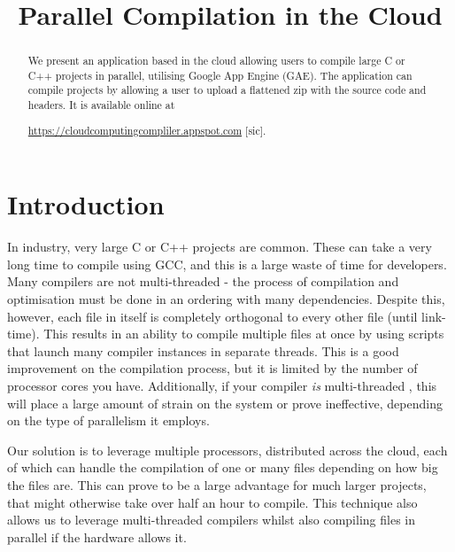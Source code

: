 \documentclass[conference]{IEEEtran}
\begin{document}
\title{Parallel Compilation in the Cloud}

\author{
\and
{}
}

\maketitle

\begin{abstract}
We present an application based in the cloud allowing users to compile large C
or C++ projects in parallel, utilising Google App Engine (GAE). The application
can compile projects by allowing a user to upload a flattened zip with the
source code and headers. It is available online at

\noindent\url{https://cloudcomputingcompliler.appspot.com} [sic].

\end{abstract}
\section{Introduction}
In industry, very large C or C++ projects are common. These can take a very
long time to compile using GCC, and this is a
large waste of time for developers. Many compilers are not multi-threaded - the
process of compilation and optimisation must be done in an ordering
with many dependencies. Despite this, however, each file in itself is completely
orthogonal to every other file (until link-time). This results in an ability to
compile multiple files at once by using scripts that launch many compiler
instances in separate threads. This is a good improvement on the compilation
process, but it is limited by the number of processor cores you have.
Additionally, if your compiler \emph{is} multi-threaded \cite{rust}, this will
place a large amount of strain on the system or prove ineffective, depending on
the type of parallelism it employs.

Our solution is to leverage multiple processors, distributed across the cloud,
each of which can handle the compilation of one or many files depending on how
big the files are. This can prove to be a large advantage for much larger
projects, that might otherwise take over half an hour to compile. This technique
also allows us to leverage multi-threaded compilers whilst also compiling files
in parallel if the hardware allows it.
\end{document}
